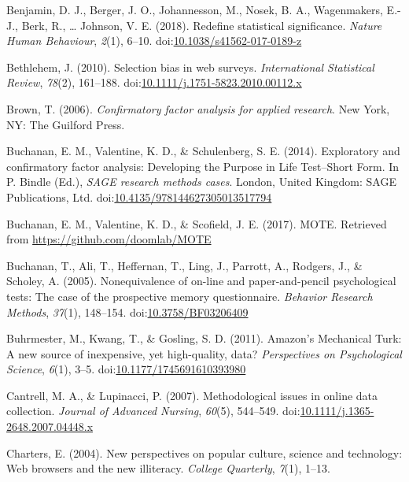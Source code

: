 \documentclass[english,man]{apa6}
\theoremstyle{definition}
\theoremstyle{definition}
\theoremstyle{definition}
\theoremstyle{remark}
\begin{document}
\hypertarget{ref-Benjamin2017}{}
Benjamin, D. J., Berger, J. O., Johannesson, M., Nosek, B. A.,
Wagenmakers, E.-J., Berk, R., \ldots{} Johnson, V. E. (2018). Redefine
statistical significance. \emph{Nature Human Behaviour}, \emph{2}(1),
6--10.
doi:\href{https://doi.org/10.1038/s41562-017-0189-z}{10.1038/s41562-017-0189-z}

\hypertarget{ref-Bethlehem2010}{}
Bethlehem, J. (2010). Selection bias in web surveys. \emph{International
Statistical Review}, \emph{78}(2), 161--188.
doi:\href{https://doi.org/10.1111/j.1751-5823.2010.00112.x}{10.1111/j.1751-5823.2010.00112.x}

\hypertarget{ref-Brown2006}{}
Brown, T. (2006). \emph{Confirmatory factor analysis for applied
research}. New York, NY: The Guilford Press.

\hypertarget{ref-Buchanan2014}{}
Buchanan, E. M., Valentine, K. D., \& Schulenberg, S. E. (2014).
Exploratory and confirmatory factor analysis: Developing the Purpose in
Life Test--Short Form. In P. Bindle (Ed.), \emph{SAGE research methods
cases}. London, United Kingdom: SAGE Publications, Ltd.
doi:\href{https://doi.org/10.4135/978144627305013517794}{10.4135/978144627305013517794}

\hypertarget{ref-Buchanan2017}{}
Buchanan, E. M., Valentine, K. D., \& Scofield, J. E. (2017). MOTE.
Retrieved from \url{https://github.com/doomlab/MOTE}

\hypertarget{ref-Buchanan2005}{}
Buchanan, T., Ali, T., Heffernan, T., Ling, J., Parrott, A., Rodgers,
J., \& Scholey, A. (2005). Nonequivalence of on-line and
paper-and-pencil psychological tests: The case of the prospective memory
questionnaire. \emph{Behavior Research Methods}, \emph{37}(1), 148--154.
doi:\href{https://doi.org/10.3758/BF03206409}{10.3758/BF03206409}

\hypertarget{ref-Buhrmester2011}{}
Buhrmester, M., Kwang, T., \& Gosling, S. D. (2011). Amazon's Mechanical
Turk: A new source of inexpensive, yet high-quality, data?
\emph{Perspectives on Psychological Science}, \emph{6}(1), 3--5.
doi:\href{https://doi.org/10.1177/1745691610393980}{10.1177/1745691610393980}

\hypertarget{ref-Cantrell2007}{}
Cantrell, M. A., \& Lupinacci, P. (2007). Methodological issues in
online data collection. \emph{Journal of Advanced Nursing},
\emph{60}(5), 544--549.
doi:\href{https://doi.org/10.1111/j.1365-2648.2007.04448.x}{10.1111/j.1365-2648.2007.04448.x}

\hypertarget{ref-Charters2004}{}
Charters, E. (2004). New perspectives on popular culture, science and
technology: Web browsers and the new illiteracy. \emph{College
Quarterly}, \emph{7}(1), 1--13.
\end{document}
